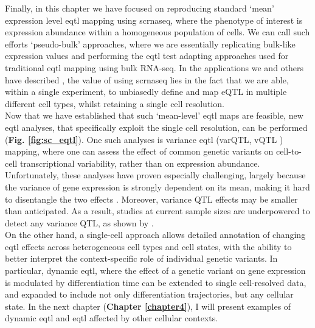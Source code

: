 Finally, in this chapter we have focused on reproducing standard `mean' expression level \gls{eqtl} mapping using \gls{scrnaseq}, where the phenotype of interest is expression abundance within a homogeneous population of cells.
We can call such efforts `pseudo-bulk' approaches, where we are essentially replicating bulk-like expression values and performing the \gls{eqtl} test adapting approaches used for traditional \gls{eqtl} mapping using bulk RNA-seq. 
In the applications we and others have described \cite{van2018single,cuomo2020single}, the value of using \gls{scrnaseq} lies in the fact that we are able, within a single experiment, to unbiasedly define and map eQTL in multiple different cell types, whilst retaining a single cell resolution.\\

Now that we have established that such `mean-level' \gls{eqtl} maps are feasible, new \gls{eqtl} analyses, that specifically exploit the single cell resolution, can be performed (\textbf{Fig. \ref{fig:sc_eqtl}}).
One such analyses is variance \gls{eqtl} (varQTL, vQTL \cite{ayroles2015behavioral}) mapping, where one can assess the effect of common genetic variants on cell-to-cell transcriptional variability, rather than on expression abundance.
Unfortunately, these analyses have proven especially challenging, largely because the variance of gene expression is strongly dependent on its mean, making it hard to disentangle the two effects \cite{vallejos2016beyond}.
Moreover, variance QTL effects may be smaller than anticipated.
As a result, studies at current sample sizes are underpowered to detect any variance QTL, as 
shown by \cite{sarkar2019discovery}. \\

On the other hand, a single-cell approach allows detailed annotation of changing \gls{eqtl} effects across heterogeneous cell types and cell states, with the ability to better interpret the context-specific role of individual genetic variants. 
In particular, dynamic \gls{eqtl}, where the effect of a genetic variant on gene expression is modulated by differentiation time \cite{francesconi2014effects, strober2019dynamic} can be extended to single cell-resolved data, and expanded to include not only differentiation trajectories, but any cellular state.
In the next chapter (\textbf{Chapter 
\ref{chapter4}}),
I will present examples of dynamic \gls{eqtl} and \gls{eqtl} affected by other cellular contexts.